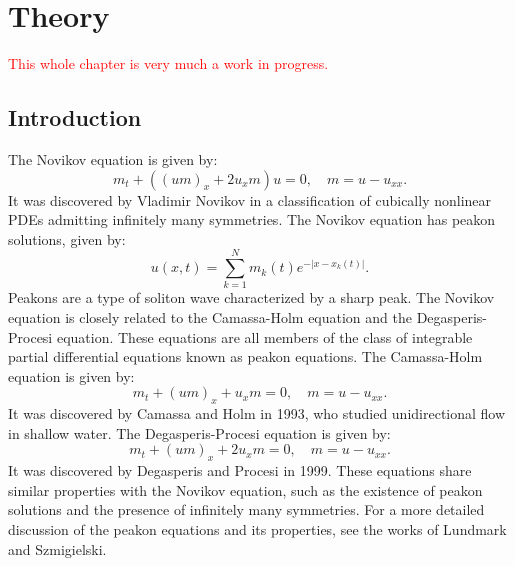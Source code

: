 \documentclass[english,master]{liumaiex}
\theoremstyle{plain}
\theoremstyle{definition}
\newcommand\todo[1]{\textcolor{red}{#1}}
\begin{document}




\tableofcontents




%
%
\mainmatter

\chapter{Theory}
\todo{This whole chapter is very much a work in progress.}

\section{Introduction}
The Novikov equation is given by:
\begin{equation} \label{eq:Novikov}
	m_t + ((um)_x + 2u_xm) u = 0,\quad m = u - u_{xx}.
\end{equation}
It was discovered by Vladimir Novikov in a classification of cubically nonlinear PDEs admitting infinitely many symmetries\cite{Novikov_2009}. The Novikov equation has peakon solutions, given by:
\begin{equation} \label{eq:peakon}
	u(x, t) = \sum_{k = 1}^{N} m_k(t) e^{-|x - x_k(t)|}.
\end{equation}
Peakons are a type of soliton wave characterized by a sharp peak.
The Novikov equation is closely related to the Camassa-Holm equation and the Degasperis-Procesi equation. These equations are all members of the class of integrable partial differential equations known as peakon equations. The Camassa-Holm equation is given by:
\begin{equation} \label{eq:CH}
	m_t + (um)_x + u_xm = 0,\quad m = u - u_{xx}.
\end{equation}
It was discovered by Camassa and Holm in 1993\cite{Camassa_1993}, who studied unidirectional flow in shallow water.
The Degasperis-Procesi equation is given by:
\begin{equation} \label{eq:DP}
	m_t + (um)_x + 2u_xm = 0,\quad m = u - u_{xx}.
\end{equation}
It was discovered by Degasperis and Procesi in 1999\cite{Degasperis_1999}. These equations share similar properties with the Novikov equation, such as the existence of peakon solutions and the presence of infinitely many symmetries. For a more detailed discussion of the peakon equations and its properties, see the works of Lundmark and Szmigielski\cite{Lundmark_2022}.
\end{document}
